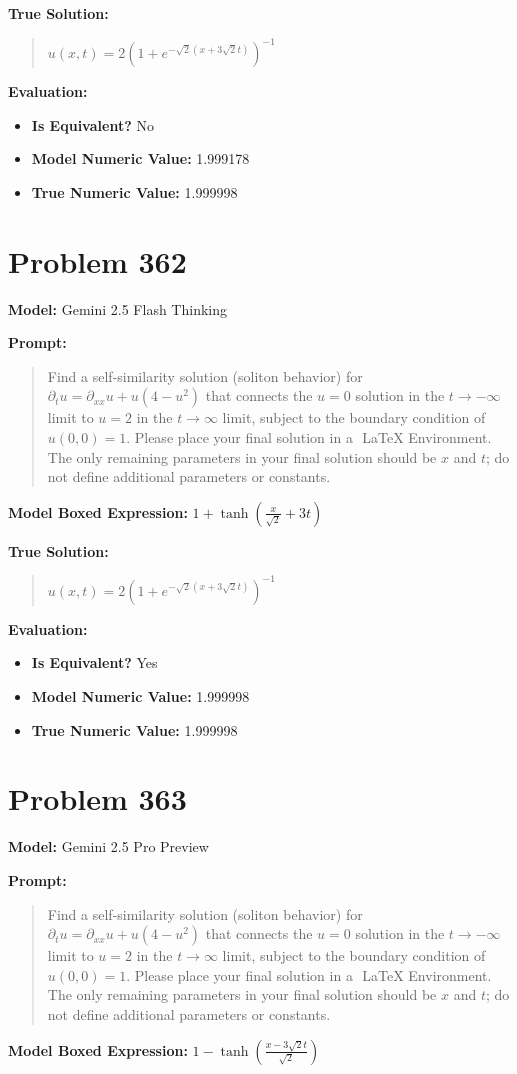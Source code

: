 \documentclass{article}
\begin{document}
{\textbf{True Solution:}
\begin{quote}
$u(x, t) = 2(1 + e^{-\sqrt{2}(x + 3\sqrt{2}t)})^{-1}$
\end{quote}

\textbf{Evaluation:}
\begin{itemize}
\item \textbf{Is Equivalent?} No
\item \textbf{Model Numeric Value:} 1.999178
\item \textbf{True Numeric Value:} 1.999998
\end{itemize}
\vspace{1cm}
\section*{Problem 362}
\textbf{Model:} Gemini 2.5 Flash Thinking

\textbf{Prompt:}
\begin{quote}
Find a self-similarity solution (soliton behavior) for $\partial_t u = \partial_{xx} u + u (4 - u^2)$ that connects the $u = 0$ solution in the $t \rightarrow -\infty$ limit to $u = 2$ in the $t \rightarrow \infty$ limit, subject to the boundary condition of $u(0, 0) = 1$. Please place your final solution in a $\boxed{}$ LaTeX Environment. The only remaining parameters in your final solution should be $x$ and $t$; do not define additional parameters or constants.
\end{quote}
\textbf{Model Boxed Expression:} $1 + \tanh\left(\frac{x}{\sqrt{2}} + 3t\right)$

\textbf{True Solution:}
\begin{quote}
$u(x, t) = 2(1 + e^{-\sqrt{2}(x + 3\sqrt{2}t)})^{-1}$
\end{quote}

\textbf{Evaluation:}
\begin{itemize}
\item \textbf{Is Equivalent?} Yes
\item \textbf{Model Numeric Value:} 1.999998
\item \textbf{True Numeric Value:} 1.999998
\end{itemize}
\vspace{1cm}
\section*{Problem 363}
\textbf{Model:} Gemini 2.5 Pro Preview

\textbf{Prompt:}
\begin{quote}
Find a self-similarity solution (soliton behavior) for $\partial_t u = \partial_{xx} u + u (4 - u^2)$ that connects the $u = 0$ solution in the $t \rightarrow -\infty$ limit to $u = 2$ in the $t \rightarrow \infty$ limit, subject to the boundary condition of $u(0, 0) = 1$. Please place your final solution in a $\boxed{}$ LaTeX Environment. The only remaining parameters in your final solution should be $x$ and $t$; do not define additional parameters or constants.
\end{quote}
\textbf{Model Boxed Expression:} $1 - \tanh\left(\frac{x-3\sqrt{2}t}{\sqrt{2}}\right)$

}
\end{document}
